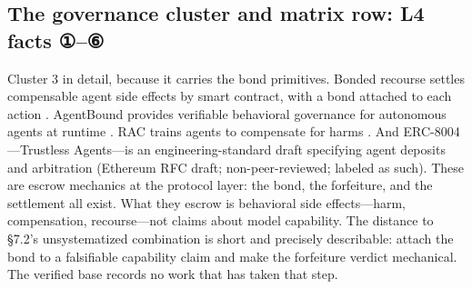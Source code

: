 \documentclass[11pt,a4paper]{article}
\begin{document}
\subsection{The governance cluster and matrix row: L4 facts ①–⑥}

Cluster 3 in detail, because it carries the bond primitives. Bonded recourse settles compensable agent side effects by smart contract, with a bond attached to each action \cite{key48}. AgentBound provides verifiable behavioral governance for autonomous agents at runtime \cite{key49}. RAC trains agents to compensate for harms \cite{key50}. And ERC-8004—Trustless Agents—is an engineering-standard draft specifying agent deposits and arbitration \cite{key51} (Ethereum RFC draft; non-peer-reviewed; labeled as such). These are escrow mechanics at the protocol layer: the bond, the forfeiture, and the settlement all exist. What they escrow is behavioral side effects—harm, compensation, recourse—not claims about model capability. The distance to §7.2's unsystematized combination is short and precisely describable: attach the bond to a falsifiable capability claim and make the forfeiture verdict mechanical. The verified base records no work that has taken that step.
\end{document}
